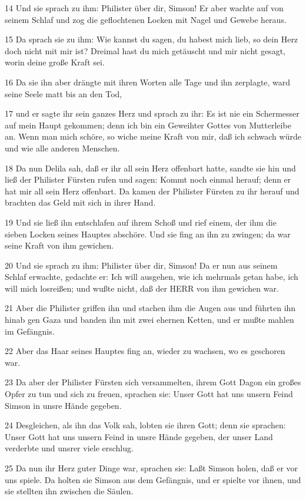 \par 14 Und sie sprach zu ihm: Philister über dir, Simson! Er aber wachte auf von seinem Schlaf und zog die geflochtenen Locken mit Nagel und Gewebe heraus.
\par 15 Da sprach sie zu ihm: Wie kannst du sagen, du habest mich lieb, so dein Herz doch nicht mit mir ist? Dreimal hast du mich getäuscht und mir nicht gesagt, worin deine große Kraft sei.
\par 16 Da sie ihn aber drängte mit ihren Worten alle Tage und ihn zerplagte, ward seine Seele matt bis an den Tod,
\par 17 und er sagte ihr sein ganzes Herz und sprach zu ihr: Es ist nie ein Schermesser auf mein Haupt gekommen; denn ich bin ein Geweihter Gottes von Mutterleibe an. Wenn man mich schöre, so wiche meine Kraft von mir, daß ich schwach würde und wie alle anderen Menschen.
\par 18 Da nun Delila sah, daß er ihr all sein Herz offenbart hatte, sandte sie hin und ließ der Philister Fürsten rufen und sagen: Kommt noch einmal herauf; denn er hat mir all sein Herz offenbart. Da kamen der Philister Fürsten zu ihr herauf und brachten das Geld mit sich in ihrer Hand.
\par 19 Und sie ließ ihn entschlafen auf ihrem Schoß und rief einem, der ihm die sieben Locken seines Hauptes abschöre. Und sie fing an ihn zu zwingen; da war seine Kraft von ihm gewichen.
\par 20 Und sie sprach zu ihm: Philister über dir, Simson! Da er nun aus seinem Schlaf erwachte, gedachte er: Ich will ausgehen, wie ich mehrmals getan habe, ich will mich losreißen; und wußte nicht, daß der HERR von ihm gewichen war.
\par 21 Aber die Philister griffen ihn und stachen ihm die Augen aus und führten ihn hinab gen Gaza und banden ihn mit zwei ehernen Ketten, und er mußte mahlen im Gefängnis.
\par 22 Aber das Haar seines Hauptes fing an, wieder zu wachsen, wo es geschoren war.
\par 23 Da aber der Philister Fürsten sich versammelten, ihrem Gott Dagon ein großes Opfer zu tun und sich zu freuen, sprachen sie: Unser Gott hat uns unsern Feind Simson in unsre Hände gegeben.
\par 24 Desgleichen, als ihn das Volk sah, lobten sie ihren Gott; denn sie sprachen: Unser Gott hat uns unsern Feind in unsre Hände gegeben, der unser Land verderbte und unsrer viele erschlug.
\par 25 Da nun ihr Herz guter Dinge war, sprachen sie: Laßt Simson holen, daß er vor uns spiele. Da holten sie Simson aus dem Gefängnis, und er spielte vor ihnen, und sie stellten ihn zwischen die Säulen.
